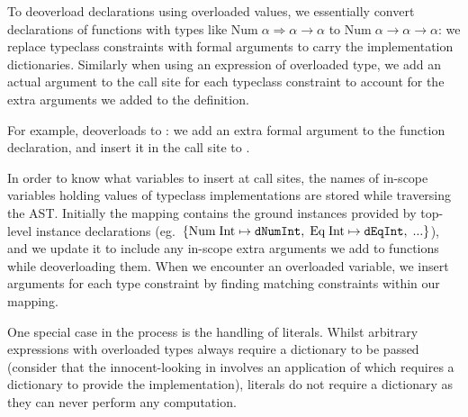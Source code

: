 \documentclass[dissertation.tex]{subfiles}
\begin{document}
{{{            To deoverload declarations using overloaded values, we essentially convert declarations of functions with
            types like \(\text{Num}\;\alpha\Rightarrow\alpha\rightarrow\alpha\) to
            \(\text{Num}\;\alpha\rightarrow\alpha\rightarrow\alpha\): we replace typeclass constraints with formal
            arguments to carry the implementation dictionaries. Similarly when using an expression of overloaded type,
            we add an actual argument to the call site for each typeclass constraint to account for the extra arguments
            we added to the definition.
        
            For example,  deoverloads to : we add an extra
            formal argument to the function declaration, and insert it in the call site to \haskell{(+)}.

            In order to know what variables to insert at call sites, the names of in-scope variables holding values of
            typeclass implementations are stored while traversing the AST. Initially the mapping contains the ground
            instances provided by top-level instance declarations (eg.\
            \(\{\text{Num\;Int}\mapsto\texttt{dNumInt},\;\text{Eq\;Int}\mapsto\texttt{dEqInt},\;...\}\)), and we update
            it to include any in-scope extra arguments we add to functions while deoverloading them. When we encounter
            an overloaded variable, we insert arguments for each type constraint by finding matching constraints within
            our mapping.

            One special case in the process is the handling of literals. Whilst arbitrary expressions with overloaded
            types always require a dictionary to be passed (consider that the innocent-looking \haskell{x} in
            \haskell{let x = 1 + 2 in x} involves an application of \haskell{(+)} which requires a dictionary to provide
            the implementation), literals do not require a dictionary as they can never perform any computation.

        }
    }
}
\end{document}
